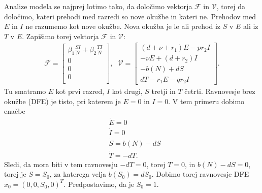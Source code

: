 \documentclass[a4paper,12pt]{article}
\newcommand{\F}{\mathcal F}
\newcommand{\V}{\mathcal V}
\begin{document}
Analize modela se najprej lotimo tako, da določimo vektorja 
\(\F\) in \(\V\), torej da določimo, kateri prehodi med razredi so nove okužbe in kateri ne. 
Prehodov med \(E\) in \(I\) ne razumemo kot nove okužbe. Nova okužba je le ali prehod iz \(S\) v \(E\) 
ali iz \(T\) v \(E\). Zapišimo torej vektorja \(\F\) in \(\V\):
\begin{align*}
    \F= 
        \begin{bmatrix}
        \beta_1\frac{SI}{N}+\beta_2\frac{TI}{N}\\
        0\\
        0\\
        0\\
        \end{bmatrix},\textrm{ }
        \V= 
        \begin{bmatrix}
        (d+\nu+r_1)E-pr_2I \\
        -\nu E +(d+r_2)I\\
        -b(N)+dS\\
        dT-r_1E-qr_2I
        \end{bmatrix}.
\end{align*}
Tu smatramo \(E\) kot prvi razred, \(I\) kot drugi, \(S\) tretji in \(T\) četrti. 
Ravnovesje brez okužbe (DFE) je tisto, pri katerem je \(E=0\) in \(I=0\). 
V tem primeru dobimo enačbe 
\begin{align*}
    &\dot{E}=0\\
    &\dot{I}=0\\
    &\dot{S}=b(N)-dS\\
    &\dot{T}=-dT.
\end{align*}
Sledi, da mora biti v tem ravnovesju \(-dT=0\), torej \(T=0\), in 
\(b(N)-dS=0\), torej je \(S=S_0\), za katerega velja \(b(S_0)=dS_0\). 
Dobimo torej ravnovesje DFE \(x_0=(0,0,S_0,0)^T\). 
Predpostavimo, da je \(S_0=1\). 
\end{document}
